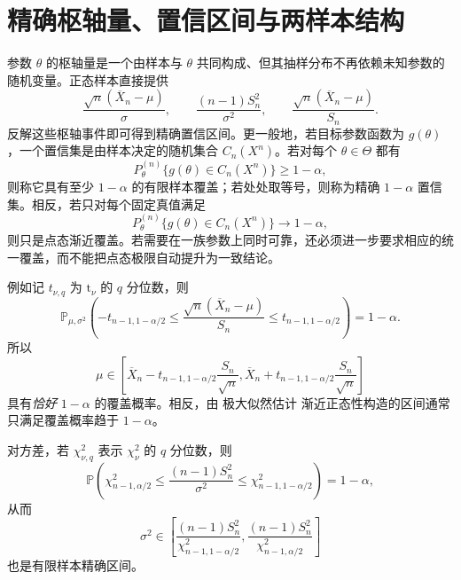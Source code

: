 \section{精确枢轴量、置信区间与两样本结构}

参数 $\theta$ 的枢轴量是一个由样本与 $\theta$ 共同构成、但其抽样分布不再依赖未知参数的随机变量。正态样本直接提供
\[
 \frac{\sqrt n(\overline X_n-\mu)}{\sigma},
 \qquad
 \frac{(n-1)S_n^2}{\sigma^2},
 \qquad
 \frac{\sqrt n(\overline X_n-\mu)}{S_n}.
\]
反解这些枢轴事件即可得到精确置信区间。更一般地，若目标参数函数为 $g(\theta)$，一个置信集是由样本决定的随机集合 $C_n(X^n)$。若对每个 $\theta\in\Theta$ 都有
\begin{equation}\label{eq:math-stat-confidence-set-definition}
 P_\theta^{(n)}\{g(\theta)\in C_n(X^n)\}\ge1-\alpha,
\end{equation}
则称它具有至少 $1-\alpha$ 的有限样本覆盖；若处处取等号，则称为精确 $1-\alpha$ 置信集。相反，若只对每个固定真值满足
\[
 P_\theta^{(n)}\{g(\theta)\in C_n(X^n)\}\longrightarrow1-\alpha,
\]
则只是点态渐近覆盖。若需要在一族参数上同时可靠，还必须进一步要求相应的统一覆盖，而不能把点态极限自动提升为一致结论。

例如记 $t_{\nu,q}$ 为 $\mathrm t_\nu$ 的 $q$ 分位数，则
\[
 \mathbb P_{\mu,\sigma^2}\!\left(
 -t_{n-1,1-\alpha/2}
 \le\frac{\sqrt n(\overline X_n-\mu)}{S_n}
 \le t_{n-1,1-\alpha/2}
 \right)=1-\alpha.
\]
所以
\[
 \mu\in
 \left[
 \overline X_n-t_{n-1,1-\alpha/2}\frac{S_n}{\sqrt n},
 \overline X_n+t_{n-1,1-\alpha/2}\frac{S_n}{\sqrt n}
 \right]
\]
具有\emph{恰好} $1-\alpha$ 的覆盖概率。相反，由 极大似然估计 渐近正态性构造的区间通常只满足覆盖概率趋于 $1-\alpha$。

对方差，若 $\chi^2_{\nu,q}$ 表示 $\chi^2_\nu$ 的 $q$ 分位数，则
\[
 \mathbb P\!\left(
 \chi^2_{n-1,\alpha/2}
 \le\frac{(n-1)S_n^2}{\sigma^2}
 \le\chi^2_{n-1,1-\alpha/2}
 \right)=1-\alpha,
\]
从而
\[
 \sigma^2\in
 \left[
 \frac{(n-1)S_n^2}{\chi^2_{n-1,1-\alpha/2}},
 \frac{(n-1)S_n^2}{\chi^2_{n-1,\alpha/2}}
 \right]
\]
也是有限样本精确区间。

